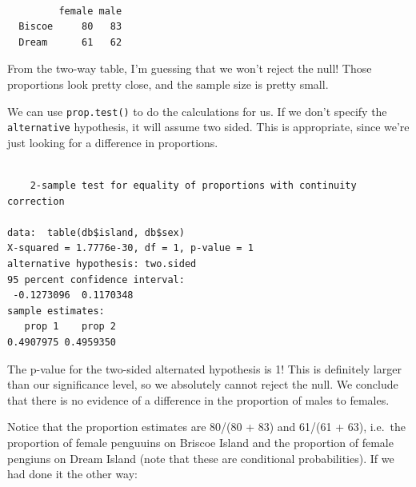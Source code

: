 \documentclass[
  letterpaper,
  DIV=11,
  numbers=noendperiod,
  oneside]{scrreprt}
\newenvironment{Shaded}{\begin{snugshade}}{\end{snugshade}}
\newcommand{\FunctionTok}[1]{\textcolor[rgb]{0.28,0.35,0.67}{#1}}
\newcommand{\NormalTok}[1]{\textcolor[rgb]{0.00,0.23,0.31}{#1}}
\newcommand{\SpecialCharTok}[1]{\textcolor[rgb]{0.37,0.37,0.37}{#1}}
\begin{document}
\begin{verbatim}
        
         female male
  Biscoe     80   83
  Dream      61   62
\end{verbatim}

From the two-way table, I'm guessing that we won't reject the null!
Those proportions look pretty close, and the sample size is pretty
small.

We can use \texttt{prop.test()} to do the calculations for us. If we
don't specify the \texttt{alternative} hypothesis, it will assume two
sided. This is appropriate, since we're just looking for a difference in
proportions.

\begin{Shaded}
\end{Shaded}

\begin{verbatim}

    2-sample test for equality of proportions with continuity correction

data:  table(db$island, db$sex)
X-squared = 1.7776e-30, df = 1, p-value = 1
alternative hypothesis: two.sided
95 percent confidence interval:
 -0.1273096  0.1170348
sample estimates:
   prop 1    prop 2 
0.4907975 0.4959350 
\end{verbatim}

The p-value for the two-sided alternated hypothesis is 1! This is
definitely larger than our significance level, so we absolutely cannot
reject the null. We conclude that there is no evidence of a difference
in the proportion of males to females.

Notice that the proportion estimates are 80/(80 + 83) and 61/(61 + 63),
i.e.~the proportion of female penguuins on Briscoe Island and the
proportion of female pengiuns on Dream Island (note that these are
conditional probabilities). If we had done it the other way:

\begin{Shaded}
\end{Shaded}
\end{document}
